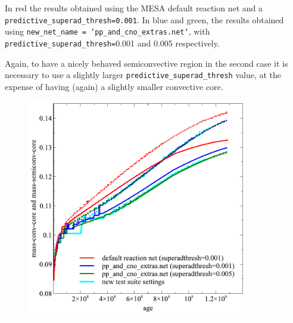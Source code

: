 \documentclass{article}
\begin{document}
In red the results obtained using the MESA default reaction net  and a \texttt{predictive\_superad\_thresh=0.001}.
In blue and green, the results obtained using \texttt{new\_net\_name = 'pp\_and\_cno\_extras.net'}, with \texttt{predictive\_superad\_thresh=}0.001 and 0.005 respectively.

Again, to have a nicely behaved semiconvective region in the second case it is necessary to use a slightly larger \texttt{predictive\_superad\_thresh} value, at the expense of having (again) a slightly smaller convective core.


 \begin{figure}[H]
	    \centering
	    \includegraphics[width = 3.8in]{reactionnet.pdf}
	    \caption{}
	    \label{fig:2}
 \end{figure}

 \pagebreak












      
\end{document}
